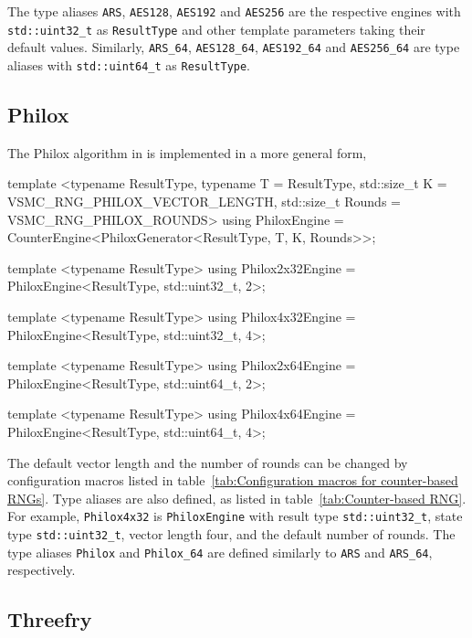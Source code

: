 The type aliases \verb|ARS|, \verb|AES128|, \verb|AES192| and \verb|AES256| are
the respective engines with \verb|std::uint32_t| as \verb|ResultType| and other
template parameters taking their default values. Similarly, \verb|ARS_64|,
\verb|AES128_64|, \verb|AES192_64| and \verb|AES256_64| are type aliases with
\verb|std::uint64_t| as \verb|ResultType|.

\subsection{Philox}
\label{sub:Philox}

The Philox algorithm in \textcite{Salmon:2011um} is implemented in a more
general form,
\begin{cppcode}
  template <typename ResultType, typename T = ResultType,
      std::size_t K = VSMC_RNG_PHILOX_VECTOR_LENGTH,
      std::size_t Rounds = VSMC_RNG_PHILOX_ROUNDS>
  using PhiloxEngine = CounterEngine<PhiloxGenerator<ResultType, T, K, Rounds>>;

  template <typename ResultType>
  using Philox2x32Engine = PhiloxEngine<ResultType, std::uint32_t, 2>;
  
  template <typename ResultType>
  using Philox4x32Engine = PhiloxEngine<ResultType, std::uint32_t, 4>;
  
  template <typename ResultType>
  using Philox2x64Engine = PhiloxEngine<ResultType, std::uint64_t, 2>;
  
  template <typename ResultType>
  using Philox4x64Engine = PhiloxEngine<ResultType, std::uint64_t, 4>;
\end{cppcode}
The default vector length and the number of rounds can be changed by
configuration macros listed in table~\ref{tab:Configuration macros for
  counter-based RNGs}. Type aliases are also defined, as listed in
table~\ref{tab:Counter-based RNG}. For example, \verb|Philox4x32| is
\verb|PhiloxEngine| with result type \verb|std::uint32_t|, state type
\verb|std::uint32_t|, vector length four, and the default number of rounds. The
type aliases \verb|Philox| and \verb|Philox_64| are defined similarly to
\verb|ARS| and \verb|ARS_64|, respectively.

\subsection{Threefry}
\label{sub:Threefry}

